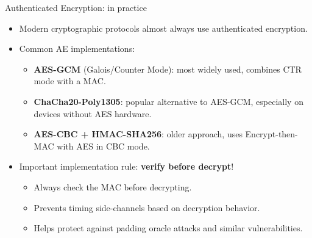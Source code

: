 \documentclass[aspectratio=169, lualatex, handout]{beamer}
\begin{document}
\begin{frame}{Authenticated Encryption: in practice}
	\begin{itemize}[<+->]
		\item Modern cryptographic protocols almost always use authenticated encryption.
		\item Common AE implementations:
		      \begin{itemize}[<+->]
			      \item \textbf{AES-GCM} (Galois/Counter Mode): most widely used, combines CTR mode with a MAC.
			      \item \textbf{ChaCha20-Poly1305}: popular alternative to AES-GCM, especially on devices without AES hardware.
			      \item \textbf{AES-CBC + HMAC-SHA256}: older approach, uses Encrypt-then-MAC with AES in CBC mode.
		      \end{itemize}
		\item Important implementation rule: \textbf{verify before decrypt}!
		      \begin{itemize}[<+->]
			      \item Always check the MAC before decrypting.
			      \item Prevents timing side-channels based on decryption behavior.
			      \item Helps protect against padding oracle attacks and similar vulnerabilities.
		      \end{itemize}
	\end{itemize}
\end{frame}
\end{document}

